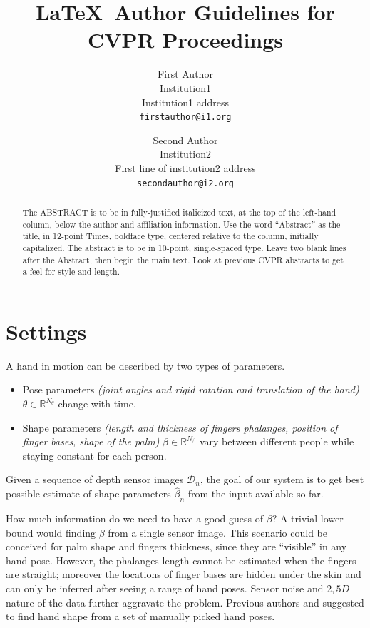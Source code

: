 \documentclass[10pt,twocolumn,letterpaper]{article}
\begin{document}
\title{\LaTeX\ Author Guidelines for CVPR Proceedings}

\author{First Author\\
Institution1\\
Institution1 address\\
{\tt\small firstauthor@i1.org}
\and
Second Author\\
Institution2\\
First line of institution2 address\\
{\tt\small secondauthor@i2.org}
}

\maketitle


\begin{abstract}
   The ABSTRACT is to be in fully-justified italicized text, at the top
   of the left-hand column, below the author and affiliation
   information. Use the word ``Abstract'' as the title, in 12-point
   Times, boldface type, centered relative to the column, initially
   capitalized. The abstract is to be in 10-point, single-spaced type.
   Leave two blank lines after the Abstract, then begin the main text.
   Look at previous CVPR abstracts to get a feel for style and length.
\end{abstract}

\section{Settings}
A hand in motion can be described by two types of parameters.
\begin{itemize}
\item Pose parameters \textit{(joint angles and rigid rotation and translation of the hand)} $\theta \in \mathbb{R}^{N_{\theta}}$ change with time. 
\item Shape parameters \textit{(length and thickness of fingers phalanges, position of finger bases, shape of the palm)} $\beta \in \mathbb{R}^{N_{\beta}}$ vary between different people while staying constant for each person. 
\end{itemize}
Given a sequence of depth sensor images $\mathcal{D}_n$, the goal of our system is to get best possible estimate of shape parameters $\hat{\beta}_n$ from the input available so far.

How much information do we need to have a good guess of $\beta$? A trivial lower bound would finding $\beta$ from a single sensor image. This scenario could be conceived for palm shape and fingers thickness, since they are ``visible'' in any hand pose. However, the phalanges length cannot be estimated when the fingers are straight; moreover the locations of finger bases are hidden under the skin and can only be inferred after seeing a range of hand poses. Sensor noise and $2,5 D$ nature of the data further aggravate the problem. 
Previous authors \cite{joseph2016fits} and \cite{tkach2016sphere} suggested to find hand shape from a set of manually picked hand poses. 
\end{document}
